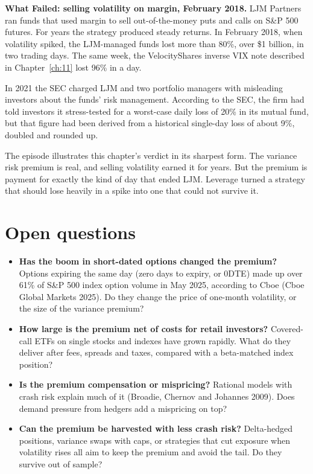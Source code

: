 \begin{callout}
\textbf{What Failed: selling volatility on margin, February 2018.} LJM Partners ran funds that used margin to sell out-of-the-money puts and calls on S\&P 500 futures. For years the strategy produced steady returns. In February 2018, when volatility spiked, the LJM-managed funds lost more than 80\%, over \$1 billion, in two trading days. The same week, the VelocityShares inverse VIX note described in Chapter~\ref{ch:11} lost 96\% in a day.

In 2021 the SEC charged LJM and two portfolio managers with misleading investors about the funds' risk management. According to the SEC, the firm had told investors it stress-tested for a worst-case daily loss of 20\% in its mutual fund, but that figure had been derived from a historical single-day loss of about 9\%, doubled and rounded up.

The episode illustrates this chapter's verdict in its sharpest form. The variance risk premium is real, and selling volatility earned it for years. But the premium is payment for exactly the kind of day that ended LJM. Leverage turned a strategy that should lose heavily in a spike into one that could not survive it.
\end{callout}

\section{Open questions}
\label{sec:14-open}

\begin{itemize}
  \item \textbf{Has the boom in short-dated options changed the premium?} Options expiring the same day (zero days to expiry, or 0DTE) made up over 61\% of S\&P 500 index option volume in May 2025, according to Cboe (Cboe Global Markets 2025). Do they change the price of one-month volatility, or the size of the variance premium?
  \item \textbf{How large is the premium net of costs for retail investors?} Covered-call ETFs on single stocks and indexes have grown rapidly. What do they deliver after fees, spreads and taxes, compared with a beta-matched index position?
  \item \textbf{Is the premium compensation or mispricing?} Rational models with crash risk explain much of it (Broadie, Chernov and Johannes 2009). Does demand pressure from hedgers add a mispricing on top?
  \item \textbf{Can the premium be harvested with less crash risk?} Delta-hedged positions, variance swaps with caps, or strategies that cut exposure when volatility rises all aim to keep the premium and avoid the tail. Do they survive out of sample?
\end{itemize}

